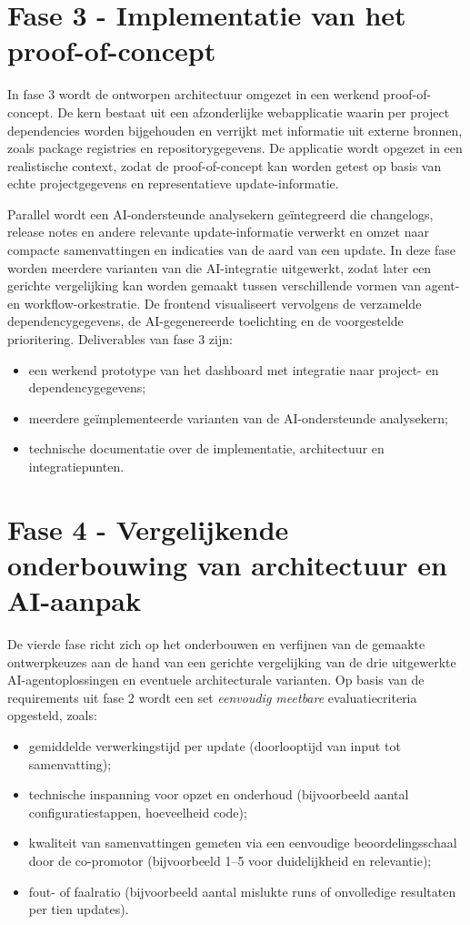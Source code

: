 \section{Fase 3 - Implementatie van het proof-of-concept}
\label{sec:fase3}

In fase 3 wordt de ontworpen architectuur omgezet in een werkend proof-of-concept. De kern bestaat uit een afzonderlijke webapplicatie waarin per project dependencies worden bijgehouden en verrijkt met informatie uit externe bronnen, zoals package registries en repositorygegevens. De applicatie wordt opgezet in een realistische context, zodat de proof-of-concept kan worden getest op basis van echte projectgegevens en representatieve update-informatie.

Parallel wordt een AI-ondersteunde analysekern geïntegreerd die changelogs, release notes en andere relevante update-informatie verwerkt en omzet naar compacte samenvattingen en indicaties van de aard van een update. In deze fase worden meerdere varianten van die AI-integratie uitgewerkt, zodat later een gerichte vergelijking kan worden gemaakt tussen verschillende vormen van agent- en workflow-orkestratie. De frontend visualiseert vervolgens de verzamelde dependencygegevens, de AI-gegenereerde toelichting en de voorgestelde prioritering. Deliverables van fase 3 zijn:
\begin{itemize}
    \item een werkend prototype van het dashboard met integratie naar project- en dependencygegevens;
    \item meerdere geïmplementeerde varianten van de AI-ondersteunde analysekern;
    \item technische documentatie over de implementatie, architectuur en integratiepunten.
\end{itemize}

\section{Fase 4 - Vergelijkende onderbouwing van architectuur en AI-aanpak}
\label{sec:fase4}

De vierde fase richt zich op het onderbouwen en verfijnen van de gemaakte ontwerpkeuzes aan de hand van een gerichte vergelijking van de drie uitgewerkte AI-agentoplossingen en eventuele architecturale varianten. Op basis van de requirements uit fase 2 wordt een set \emph{eenvoudig meetbare} evaluatiecriteria opgesteld, zoals:
\begin{itemize}
    \item gemiddelde verwerkingstijd per update (doorlooptijd van input tot samenvatting);
    \item technische inspanning voor opzet en onderhoud (bijvoorbeeld aantal configuratiestappen, hoeveelheid code);
    \item kwaliteit van samenvattingen gemeten via een eenvoudige beoordelingsschaal door de co-promotor (bijvoorbeeld 1–5 voor duidelijkheid en relevantie);
    \item fout- of faalratio (bijvoorbeeld aantal mislukte runs of onvolledige resultaten per tien updates).
\end{itemize}

